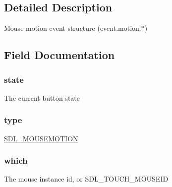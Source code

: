 \subsection{Detailed Description}
Mouse motion event structure (event.\+motion.$\ast$) 

\subsection{Field Documentation}
\subsubsection[{\texorpdfstring{state}{state}}]{ state}\hypertarget{struct_s_d_l___mouse_motion_event_a497fc2f5ff5e968b3d0b643a537a71fb}{}\label{struct_s_d_l___mouse_motion_event_a497fc2f5ff5e968b3d0b643a537a71fb}
The current button state 
\subsubsection[{\texorpdfstring{type}{type}}]{ type}\hypertarget{struct_s_d_l___mouse_motion_event_aa40a9b05c3154032b9f2d7220e9f08dc}{}\label{struct_s_d_l___mouse_motion_event_aa40a9b05c3154032b9f2d7220e9f08dc}
\hyperlink{_s_d_l__events_8h_a3b589e89be6b35c02e0dd34a55f3fccaa04c436ef80fef38fb77a89e0e9124c30}{S\+D\+L\+\_\+\+M\+O\+U\+S\+E\+M\+O\+T\+I\+ON} 
\subsubsection[{\texorpdfstring{which}{which}}]{ which}\hypertarget{struct_s_d_l___mouse_motion_event_abd239700243abe3b42bfee05bbf65fa7}{}\label{struct_s_d_l___mouse_motion_event_abd239700243abe3b42bfee05bbf65fa7}
The mouse instance id, or S\+D\+L\+\_\+\+T\+O\+U\+C\+H\+\_\+\+M\+O\+U\+S\+E\+ID 
